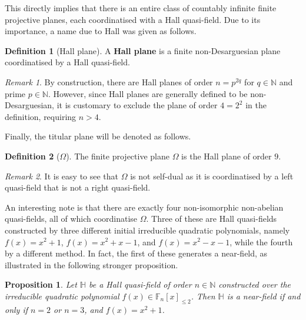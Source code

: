 \documentclass{report}
\newcommand{\N}{\mathbb{N}}
\newcommand{\F}{\mathbb{F}}
\renewcommand{\H}{\mathbb{H}}
\newtheorem{proposition}[theorem]{Proposition}
\theoremstyle{definition}\newtheorem*{definition}{Definition}
\theoremstyle{definition}\newtheorem*{example}{Example}
\theoremstyle{remark}\newtheorem*{remark}{Remark}
\begin{document}
This directly implies that there is an entire class of countably infinite finite projective planes, each coordinatised with a Hall quasi-field. Due to its importance, a name due to Hall was given as follows.

\begin{definition}[Hall plane]
A \textbf{Hall plane} is a finite non-Desarguesian plane coordinatised by a Hall quasi-field.
\end{definition}

\begin{remark}
By construction, there are Hall planes of order $ n = p^{2q} $ for $ q \in \N $ and prime $ p \in \N $. However, since Hall planes are generally defined to be non-Desarguesian, it is customary to exclude the plane of order $ 4 = 2^2 $ in the definition, requiring $ n > 4 $.
\end{remark}

Finally, the titular plane will be denoted as follows.

\begin{definition}[$ \Omega $]
The finite projective plane $ \Omega $ is the Hall plane of order $ 9 $.
\end{definition}

\begin{remark}
It is easy to see that $ \Omega $ is not self-dual as it is coordinatised by a left quasi-field that is not a right quasi-field.
\end{remark}

An interesting note is that there are exactly four non-isomorphic non-abelian quasi-fields, all of which coordinatise $ \Omega $. Three of these are Hall quasi-fields constructed by three different initial irreducible quadratic polynomials, namely $ f(x) = x^2 + 1 $, $ f(x) = x^2 + x - 1 $, and $ f(x) = x^2 - x - 1 $, while the fourth by a different method. In fact, the first of these generates a near-field, as illustrated in the following stronger proposition.

\begin{proposition}
Let $ \H $ be a Hall quasi-field of order $ n \in \N $ constructed over the irreducible quadratic polynomial $ f(x) \in \F_n[x]_{\le 2} $. Then $ \H $ is a near-field if and only if $ n = 2 $ or $ n = 3 $, and $ f(x) = x^2 + 1 $.
\end{proposition}
\end{document}
